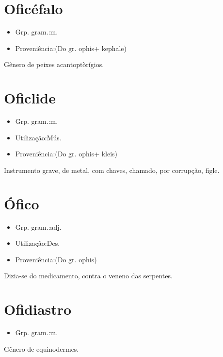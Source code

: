 \section{Oficéfalo}
\begin{itemize}
\item {Grp. gram.:m.}
\end{itemize}
\begin{itemize}
\item {Proveniência:(Do gr. \textunderscore ophis\textunderscore  + \textunderscore kephale\textunderscore )}
\end{itemize}
Gênero de peixes acantoptòrígios.
\section{Oficlide}
\begin{itemize}
\item {Grp. gram.:m.}
\end{itemize}
\begin{itemize}
\item {Utilização:Mús.}
\end{itemize}
\begin{itemize}
\item {Proveniência:(Do gr. \textunderscore ophis\textunderscore  + \textunderscore kleis\textunderscore )}
\end{itemize}
Instrumento grave, de metal, com chaves, chamado, por corrupção, \textunderscore figle\textunderscore .
\section{Ófico}
\begin{itemize}
\item {Grp. gram.:adj.}
\end{itemize}
\begin{itemize}
\item {Utilização:Des.}
\end{itemize}
\begin{itemize}
\item {Proveniência:(Do gr. \textunderscore ophis\textunderscore )}
\end{itemize}
Dizia-se do medicamento, contra o veneno das serpentes.
\section{Ofidiastro}
\begin{itemize}
\item {Grp. gram.:m.}
\end{itemize}
Gênero de equinodermes.

